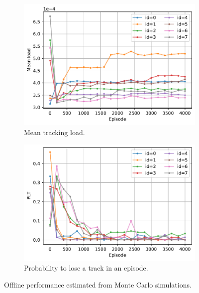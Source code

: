\documentclass[english, 12pt, a4paper, elec, utf8, a-1b, online]{aaltothesis}
\begin{document}
\begin{figure}[htb]
    \centering
    \begin{subfigure}[b]{0.7\textwidth}
        \includegraphics[width=\textwidth]{figures/benchmark/Training/offline_load.pdf}
        \caption{Mean tracking load.}
        \label{fig:offline_load}
    \end{subfigure}
    \hfill
    \begin{subfigure}[b]{0.7\textwidth}
        \includegraphics[width=\textwidth]{figures/benchmark/Training/offline_plt.pdf}
        \caption{Probability to lose a track in an episode.}
        \label{fig:offline_lost}
    \end{subfigure}
    \caption{
        Offline performance estimated from Monte Carlo simulations.
    }
    \label{fig:offline_performance}
\end{figure}
\end{document}
